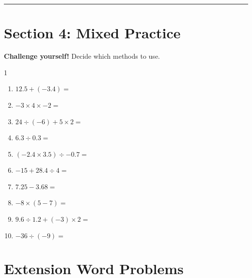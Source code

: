 \documentclass[12pt,a4paper]{article}
\begin{document}
\vspace{1em}
\hrule
\vspace{1em}


\section*{Section 4: Mixed Practice}

\textbf{Challenge yourself!} Decide which methods to use.

\begin{multicols}{1}
\begin{enumerate}
\item $12.5 + (-3.4) =$ \
\vspace{1em}
\item $-3 \times 4 \times -2 =$ \
\vspace{1em}
\item $24 \div (-6) + 5 \times 2 =$ \
\vspace{1em}
\item $6.3 \div 0.3 =$ \
\vspace{1em}
\item $(-2.4 \times 3.5) \div -0.7 =$ \
\vspace{1em}
\item $-15 + 28.4 \div 4 =$ \
\vspace{1em}
\item $7.25 - 3.68 =$ \
\vspace{1em}
\item $-8 \times (5 - 7) =$ \
\vspace{1em}
\item $9.6 \div 1.2 + (-3) \times 2 =$ \
\vspace{1em}
\item $-36 \div (-9) =$ \
\vspace{1em}
\end{enumerate}
\end{multicols}

\section*{Extension Word Problems}
\end{document}
